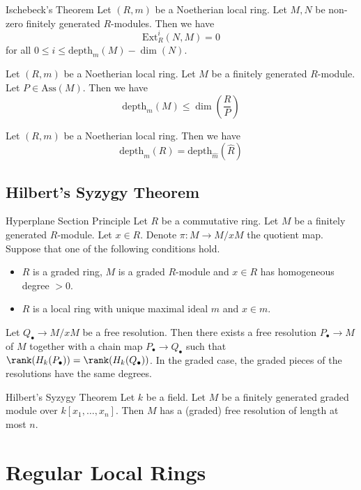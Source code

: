 \documentclass[a4paper]{article}
\begin{document}
\begin{thm}{Ischebeck's Theorem}{} Let $(R,m)$ be a Noetherian local ring. Let $M,N$ be non-zero finitely generated $R$-modules. Then we have $$\text{Ext}_R^i(N,M)=0$$ for all $0\leq i\leq\text{depth}_m(M)-\dim(N)$. 
\end{thm}

\begin{prp}{}{} Let $(R,m)$ be a Noetherian local ring. Let $M$ be a finitely generated $R$-module. Let $P\in\text{Ass}(M)$. Then we have $$\text{depth}_m(M)\leq\dim\left(\frac{R}{P}\right)$$
\end{prp}

\begin{prp}{}{} Let $(R,m)$ be a Noetherian local ring. Then we have $$\text{depth}_m(R)=\text{depth}_{\widehat{m}}(\widehat{R})$$
\end{prp}

\subsection{Hilbert's Syzygy Theorem}
\begin{lmm}{Hyperplane Section Principle}{} Let $R$ be a commutative ring. Let $M$ be a finitely generated $R$-module. Let $x\in R$. Denote $\pi:M\to M/xM$ the quotient map. Suppose that one of the following conditions hold. 
\begin{itemize}
\item $R$ is a graded ring, $M$ is a graded $R$-module and $x\in R$ has homogeneous degree $>0$. 
\item $R$ is a local ring with unique maximal ideal $m$ and $x\in m$. 
\end{itemize}
Let $Q_\bullet\to M/xM$ be a free resolution. Then there exists a free resolution $P_\bullet\to M$ of $M$ together with a chain map $P_\bullet\to Q_\bullet$ such that $\rank(H_k(P_\bullet))=\rank(H_k(Q_\bullet))$. In the graded case, the graded pieces of the resolutions have the same degrees. 
\end{lmm}

\begin{thm}{Hilbert's Syzygy Theorem}{} Let $k$ be a field. Let $M$ be a finitely generated graded module over $k[x_1,\dots,x_n]$. Then $M$ has a (graded) free resolution of length at most $n$. 
\end{thm}

\pagebreak
\section{Regular Local Rings}
\end{document}
